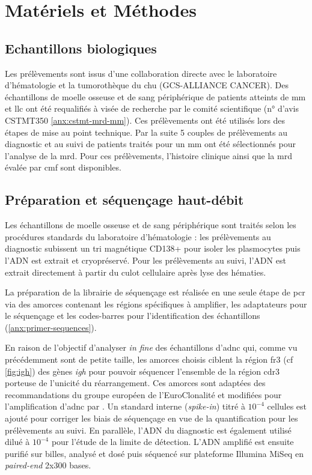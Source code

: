 \chapter{Matériels et Méthodes}

\section{Echantillons biologiques}

Les prélèvements sont issus d'une collaboration directe avec le laboratoire d'hématologie et la tumorothèque du 
\gls{chu} (GCS-ALLIANCE CANCER). Des échantillons de moelle osseuse et de sang périphérique de patients 
atteints de \gls{mm} et \gls{llc} ont été requalifiés à visée de recherche par le comité scientifique (n° d'avis CSTMT350 \autoref{anx:cstmt-mrd-mm}). 
Ces prélèvements ont été utilisés lors des étapes de mise au point technique. Par la suite 5 couples de prélèvements 
au diagnostic et au suivi de patients traités pour un \gls{mm} ont été sélectionnés pour l'analyse de la \gls{mrd}. Pour ces 
prélèvements, l'histoire clinique ainsi que la \gls{mrd} évalée par \gls{cmf} sont disponibles.

\section{Préparation et séquençage haut-débit}

Les échantillons de moelle osseuse et de sang périphérique sont traités selon les procédures standards du laboratoire 
d'hématologie : les prélèvements au diagnostic subissent un tri magnétique CD138+ pour isoler les plasmocytes puis l'ADN 
est extrait et cryopréservé. Pour les prélèvements au suivi, l'ADN est extrait directement à partir du culot cellulaire 
après lyse des hématies.

La préparation de la librairie de séquençage est réalisée en une seule étape de \gls{pcr} via des amorces contenant les 
régions spécifiques à amplifier, les adaptateurs pour le séquençage et les codes-barres pour l'identification des échantillons 
(\autoref{anx:primer-sequences}).

En raison de l'objectif d'analyser \textit{in fine} des échantillons d'\gls{adnc} qui, comme vu précédemment sont de petite taille, 
les amorces choisis ciblent la région \gls{fr}3 (cf \autoref{fig:igh}) des gènes \textit{\gls{igh}} pour pouvoir séquencer l'ensemble de la 
région \gls{cdr}3 porteuse de l'unicité du réarrangement. 
Ces amorces sont adaptées des recommandations du groupe européen de l'EuroClonalité \cite{langerakEuroClonalityBIOMED2Guidelines2012} 
et modifiées pour l'amplification d'\gls{adnc} par \citeauthor{pottCfDNABasedNGSIG2022a} \cite{pottCfDNABasedNGSIG2022a}.
Un standard interne (\textit{spike-in}) titré à $10^{-4}$ cellules est ajouté pour corriger les biais de séquençage en vue de la quantification 
pour les prélèvements au suivi. En parallèle, l'ADN du diagnostic est également utilisé dilué à $10^{-4}$ pour l'étude de la limite de détection. 
L'ADN amplifié est ensuite purifié sur billes, analysé et dosé puis séquencé sur plateforme Illumina MiSeq en \textit{paired-end} 2x300 bases.

